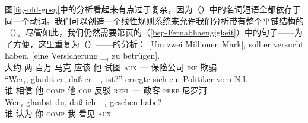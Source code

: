 图\ref{fig-nld-gpsg}中的分析看起来有点过于复杂，因为（）中的名词短语全都依存于同一个动词。我们可以创造一个线性规则系统来允许我们分析带有整个平铺结构的（）。尽管如此，我们仍然需要第\pageref{bsp-Fernabhaengigkeit}页的（\ref{bsp-Fernabhaengigkeit}）中的句子——为了方便，这里重复为（）——的分析：
\eal
\ex\label{bsp-um-zwei-millionen-zwei}
\gll {}[Um zwei Millionen Mark]$_i$ soll er versucht haben, [eine Versicherung \_$_i$ zu betrügen].\footnotemark\\
       {}\spacebr{}大约 两 百万 马克 应该 他 试图 \textsc{aux} \spacebr{}一 保险公司 {} \textsc{inf} 欺骗\\
\ex
\gll "`Wer$_i$, glaubt er, daß er \_$_i$ ist?"' erregte sich ein Politiker vom Nil.\footnotemark\\
    \spacebr{}谁 相信 他 \textsc{comp} 他 {} \textsc{cop} 反驳 \textsc{refl} 一 政客 \textsc{prep} 尼罗河\\
\ex\label{ex-wen-glaubst-du-dass-zwei}
\gll Wen$_i$ glaubst du, daß ich \_$_i$ gesehen habe?\footnotemark\\
     谁 认为 你 \textsc{comp} 我 {} 看见 \textsc{aux}\\
\ex
